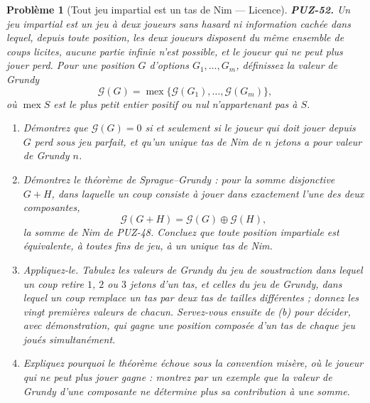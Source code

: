 \documentclass[11pt]{article}
\newtheorem{problem}{Problème}
\begin{document}
\bigskip

\begin{problem}[{Tout jeu impartial est un tas de Nim --- Licence}]
\textbf{PUZ-52.} Un jeu \textit{impartial} est un jeu à deux joueurs sans hasard ni
information cachée dans lequel, depuis toute position, les deux joueurs disposent du même
ensemble de coups licites, aucune partie infinie n'est possible, et le joueur qui ne peut
plus jouer perd. Pour une position $ G $ d'options $ G_1, \dots, G_m $, définissez la
valeur de Grundy
\[ \mathcal{G}(G) = \operatorname{mex}\{\mathcal{G}(G_1), \dots, \mathcal{G}(G_m)\}, \]
où $ \operatorname{mex} S $ est le plus petit entier positif ou nul n'appartenant pas à
$ S $.
\begin{enumerate}
\item[(a)] Démontrez que $ \mathcal{G}(G) = 0 $ si et seulement si le joueur qui doit jouer
depuis $ G $ perd sous jeu parfait, et qu'un unique tas de Nim de $ n $ jetons a pour
valeur de Grundy $ n $.
\item[(b)] Démontrez le théorème de Sprague--Grundy : pour la somme disjonctive $ G + H $, dans
laquelle un coup consiste à jouer dans exactement l'une des deux composantes,
\[ \mathcal{G}(G + H) = \mathcal{G}(G) \oplus \mathcal{G}(H), \]
la somme de Nim de PUZ-48. Concluez que toute position impartiale est équivalente, à toutes
fins de jeu, à un unique tas de Nim.
\item[(c)] Appliquez-le. Tabulez les valeurs de Grundy du jeu de soustraction dans lequel un coup
retire $ 1 $, $ 2 $ ou $ 3 $ jetons d'un tas, et celles du jeu de Grundy, dans lequel
un coup remplace un tas par deux tas de tailles \textit{différentes} ; donnez les vingt
premières valeurs de chacun. Servez-vous ensuite de (b) pour décider, avec démonstration,
qui gagne une position composée d'un tas de chaque jeu joués simultanément.
\item[(d)] Expliquez pourquoi le théorème échoue sous la convention misère, où le joueur qui ne
peut plus jouer gagne : montrez par un exemple que la valeur de Grundy d'une composante ne
détermine plus sa contribution à une somme.
\end{enumerate}

\end{problem}
\end{document}
